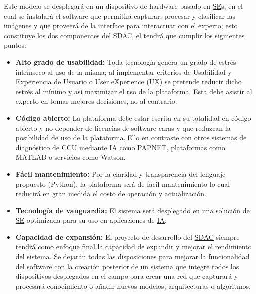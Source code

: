 Este modelo se desplegará en un dispositivo de hardware basado en
\hyperlink{abbr}{SE}s, en el cual se instalará el software que permitirá
capturar, procesar y clasificar las imágenes y que proveerá de la interface para
interactuar con el experto; esto constituye los dos componentes del
\hyperlink{abbr}{SDAC}, el tendrá que cumplir los siguientes puntos:

\begin{itemize}
    \item{\textbf{Alto grado de usabilidad:}} Toda tecnología genera un grado de
    estrés intrínseco al uso de la misma; al implementar criterios de Usabilidad
    y Experiencia de Usuario o User eXperience
    (\hyperlink{abbr}{UX}) se pretende reducir
    dicho estrés al mínimo y así maximizar el uso de la plataforma. Esta debe
    asistir al experto en tomar mejores decisiones, no al
    contrario.~\cite{Nielsen1993}
    \item{\textbf{Código abierto:}}  La plataforma debe estar escrita en su
    totalidad en código abierto y no depender de licencias de software caras y
    que reduzcan la posibilidad de uso de la plataforma. Ello en contraste con
    otros sistemas de diagnóstico de \hyperlink{abbr}{CCU} mediante
    \hyperlink{abbr}{IA} como PAPNET, plataformas como MATLAB o servicios como
    Watson.~\cite{Zhou}
    \item{\textbf{Fácil mantenimiento:}}  Por la claridad y transparencia del
    lenguaje propuesto (Python), la plataforma será de fácil mantenimiento lo
    cual reducirá en gran medida el costo de operación y
    actualización.~\cite{Pedrycz2017}
    \item{\textbf{Tecnología de vanguardia:}} El sistema será desplegado en una
    solución de \hyperlink{abbr}{SE} optimizada para su uso en aplicaciones de
    \hyperlink{abbr}{IA}. 
    \item{\textbf{Capacidad de expansión:}} El proyecto de desarrollo del \hyperlink{abbr}{SDAC}
    siempre tendrá como enfoque final la capacidad de expandir y mejorar el
    rendimiento del sistema. Se dejarán todas las disposiciones para mejorar la
    funcionalidad del software con la creación posterior de un sistema que
    integre todos los dispositivos desplegados en el campo para crear una red
    que capturará y procesará conocimiento o añadir nuevos modelos,
    arquitecturas o algoritmos.
\end{itemize}
